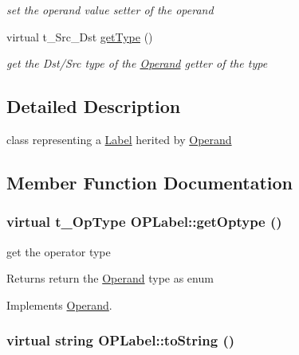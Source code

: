 \begin{DoxyCompactItemize}
\begin{DoxyCompactList}\small\item\em set the operand value setter of the operand \item\end{DoxyCompactList}\item 
\hypertarget{classOPLabel_a602f62f783c370402b4841b0aed1f307}{
virtual t\_\-Src\_\-Dst \hyperlink{classOPLabel_a602f62f783c370402b4841b0aed1f307}{getType} ()}
\label{classOPLabel_a602f62f783c370402b4841b0aed1f307}

\begin{DoxyCompactList}\small\item\em get the Dst/Src type of the \hyperlink{classOperand}{Operand} getter of the type \item\end{DoxyCompactList}\end{DoxyCompactItemize}


\subsection{Detailed Description}
class representing a \hyperlink{classLabel}{Label} herited by \hyperlink{classOperand}{Operand} 

\subsection{Member Function Documentation}
\hypertarget{classOPLabel_a840489088fc49c57b02264089ec4c55b}{
\subsubsection[{getOptype}]{\setlength{\rightskip}{0pt plus 5cm}virtual t\_\-OpType OPLabel::getOptype ()}}
\label{classOPLabel_a840489088fc49c57b02264089ec4c55b}


get the operator type \begin{DoxyReturn}{Returns}
return the \hyperlink{classOperand}{Operand} type as enum 
\end{DoxyReturn}


Implements \hyperlink{classOperand_af4bd7dab87bfd7f3c17ea84f07b02b69}{Operand}.\hypertarget{classOPLabel_a94c9cdc5cf0b3af05a1f917c0d650056}{
\subsubsection[{toString}]{\setlength{\rightskip}{0pt plus 5cm}virtual string OPLabel::toString ()}}
\label{classOPLabel_a94c9cdc5cf0b3af05a1f917c0d650056}


